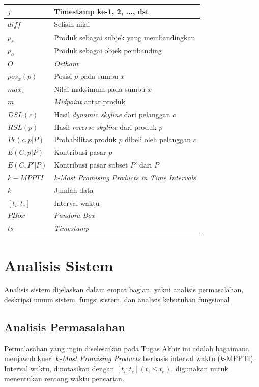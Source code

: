 \begin{longtable}{| p{3cm} | p{6cm} |}
	$j$ & Timestamp ke-1, 2, ..., dst\\ \hline
	$diff$ & Selisih nilai \\ \hline
	$p_s$ & Produk sebagai subjek yang membandingkan \\ \hline
	$p_o$ & Produk sebagai objek pembanding \\ \hline
	$O$ & \textit{Orthant}\\ \hline
	$pos_x(p)$ & Posisi $p$ pada sumbu $x$ \\ \hline
	$max_x$ & Nilai maksimum pada sumbu $x$ \\ \hline
	$m$ & \textit{Midpoint} antar produk\\ \hline
	$DSL(c)$ & Hasil \textit{dynamic skyline} dari pelanggan $c$\\ \hline
	$RSL(p)$ & Hasil \textit{reverse skyline} dari produk $p$\\ \hline
	$Pr(c, p|P)$ & Probabilitas produk $p$ dibeli oleh pelanggan $c$ \\ \hline
	$E(C, p|P)$ & Kontribusi pasar $p$\\ \hline
	$E(C, P'|P)$ & Kontribusi pasar subset $P'$ dari $P$ \\ \hline
	$k-MPPTI$ & \textit{k-Most Promising Products in Time Intervals} \\ \hline
	$k$ & Jumlah data \\ \hline
	$[t_i:t_e]$ & Interval waktu \\ \hline
	$PBox$ & \textit{Pandora Box} \\ \hline	
	$ts$ & \textit{Timestamp} \\ \hline	
\end{longtable}

\section{Analisis Sistem}
\tab Analisis sistem dijelaskan dalam empat bagian, yakni analisis permasalahan, deskripsi umum sistem, fungsi sistem, dan analisis kebutuhan fungsional.

\subsection{Analisis Permasalahan}
\tab Permalasahan yang ingin diselesaikan pada Tugas Akhir ini adalah bagaimana menjawab kueri \textit{$k$-Most Promising Products} berbasis interval waktu ($k$-MPPTI). Interval waktu, dinotasikan dengan $[t_i:t_e ](t_i \leq t_e)$, digunakan untuk menentukan rentang waktu pencarian.

